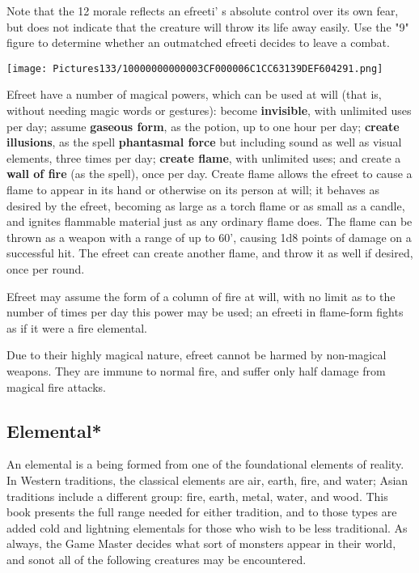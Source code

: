 \documentclass[a4paper,twoside,openany,10pt]{book}
\begin{document}
\begin{multicols}{2}
Note that the 12 morale reflects an efreeti' s absolute control over its own fear, but does not indicate that the creature will throw its life away easily. Use the "9" figure to determine whether an outmatched efreeti decides to leave a combat.


\begin{center}
	\texttt{[image: Pictures133/10000000000003CF000006C1CC63139DEF604291.png]}
\end{center}

Efreet have a number of magical powers, which can be used at will (that is, without needing magic words or gestures): become \textbf{invisible}, with unlimited uses per day; assume \textbf{gaseous form}, as the potion, up to one hour per day; \textbf{create illusions}, as the spell \textbf{phantasmal force} but including sound as well as visual elements, three times per day; \textbf{create flame}, with unlimited uses; and create a \textbf{wall of fire }(as the spell), once per day. Create flame allows the efreet to cause a flame to appear in its hand or otherwise on its person at will; it behaves as desired by the efreet, becoming as large as a torch flame or as small as a candle, and ignites flammable material just as any ordinary flame does. The flame can be thrown as a weapon with a range of up to 60', causing 1d8 points of damage on a successful hit. The efreet can create another flame, and throw it as well if desired, once per round.

Efreet may assume the form of a column of fire at will, with no limit as to the number of times per day this power may be used; an efreeti in flame-form fights as if it were a fire elemental.

Due to their highly magical nature, efreet cannot be harmed by non-magical weapons. They are immune to normal fire, and suffer only half damage from magical fire attacks.


\subsection*{Elemental*}\label{elemental}

An elemental is a being formed from one of the foundational elements of reality. In Western traditions, the classical elements are air, earth, fire, and water; Asian traditions include a different group: fire, earth, metal, water, and wood. This book presents the full range needed for either tradition, and to those types are added cold and lightning elementals for those who wish to be less traditional. As always, the Game Master decides what sort of monsters appear in their world, and sonot all of the following creatures may be encountered.


\end{multicols}
\end{document}
